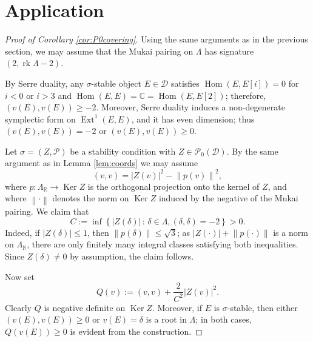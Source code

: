 \documentclass[leqno,11pt,twoside]{amsart}
\theoremstyle{definition}
\begin{document}
\section{Application} \label{sect:application}

\begin{proof}[Proof of Corollary \ref{cor:P0covering}]
Using the same arguments as in the previous section, we may assume that the Mukai pairing
on $\Lambda$ has signature $(2, {\mathop{\mathrm{rk}}} \Lambda -2)$. 

By Serre duality, any $\sigma$-stable object $E \in {\ensuremath{\mathcal D}}$ satisfies ${\mathop{\mathrm{Hom}}\nolimits}(E, E[i]) = 0$ for
$i < 0$ or $i > 3$ and ${\mathop{\mathrm{Hom}}\nolimits}(E, E) = {\ensuremath{\mathbb{C}}} = {\mathop{\mathrm{Hom}}\nolimits}(E, E[2])$; therefore, $(v(E), v(E)) \ge -2$.
Moreover, Serre duality induces a non-degenerate symplectic form on ${\mathop{\mathrm{Ext}}\nolimits}^1(E, E)$, and it
has even dimension; thus $(v(E), v(E)) = -2$ or $(v(E), v(E)) \ge 0$.

Let $\sigma = (Z, {\ensuremath{\mathcal P}})$ be a stability condition with $Z \in {\ensuremath{\mathcal P}}_0({\ensuremath{\mathcal D}})$. By the same argument as in 
Lemma \ref{lem:coords} we may assume
\[ (v, v) = {\left\lvert{Z(v)}\right\rvert}^2 - {\left\|{p(v)}\right\|}^2, \]
where $p \colon \Lambda_{\ensuremath{\mathbb{R}}} \to {\mathop{\mathrm{Ker}}\nolimits} Z$ is the orthogonal projection onto the kernel of $Z$, and
where ${\left\|{\cdot}\right\|}$ denotes the norm on ${\mathop{\mathrm{Ker}}\nolimits} Z$ induced by the negative of the Mukai pairing.
We claim that  
\begin{equation} \label{eq:defZ}
C:= {\mathop{\mathrm{inf}}\nolimits} {\left\{{{\left\lvert{Z(\delta)}\right\rvert}}\,\colon\,{\delta \in \Lambda, (\delta, \delta) = -2}\right\}} > 0.
\end{equation}
Indeed, if ${\left\lvert{Z(\delta)}\right\rvert} \le 1$, then ${\left\|{p(\delta)}\right\|} \le \sqrt{3}$;
as ${\left\lvert{Z(\cdot)}\right\rvert} + {\left\|{p(\cdot)}\right\|}$ is a norm on $\Lambda_{\ensuremath{\mathbb{R}}}$,
there are only finitely many integral classes satisfying both inequalities.
Since $Z(\delta) \neq 0$ by assumption, the claim follows.

Now set 
\[ Q(v) := (v, v) + \frac 2{C^2} {\left\lvert{Z(v)}\right\rvert}^2. \]
Clearly $Q$ is negative definite on ${\mathop{\mathrm{Ker}}\nolimits} Z$. Moreover, if $E$ is $\sigma$-stable, then
either $(v(E), v(E)) \ge 0$ or $v(E) = \delta$ is a root in $\Lambda$; in both cases,  $Q(v(E)) \ge 0$ is evident
from the construction.


\end{proof}
\end{document}
